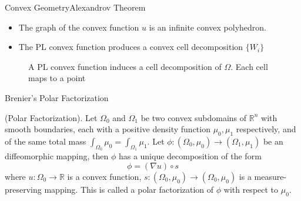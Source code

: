 \documentclass{beamer}
\theoremstyle{definition}
\begin{document}
\begin{frame}{Convex Geometry}{Alexandrov Theorem}
\begin{itemize}
\item The graph of the convex function $u$ is an infinite convex polyhedron.
\item The PL convex function produces a convex cell decomposition $\{W_i\}$
\end{itemize}
\begin{figure}
\centering
{}
\caption{A PL convex function induces a cell decomposition of $\Omega$. Each cell maps to a point}
\label{fig:Alex}
\end{figure}
\end{frame}



\begin{frame}{Brenier's Polar Factorization}
\begin{theorem}
(Polar Factorization\cite{brenier1991polar}). Let $\Omega_0$ and $\Omega_1$ be two convex subdomains of $\mathbb{R}^n$ with smooth boundaries, each with a positive density function $\mu_0,\mu_1$ respectively, and of the same total mass $\int_{\Omega_0}\mu_0=\int_{\Omega_1}\mu_1$. Let $\phi:(\Omega_0,\mu_0)\rightarrow (\Omega_1, \mu_1)$ be an diffeomorphic mapping, then $\phi$ has a unique decomposition of the form $$\phi=(\nabla u)\circ s$$ where $u:\Omega_0\rightarrow \mathbb{R}$ is a convex function, $s:(\Omega_0,\mu_0)\rightarrow(\Omega_0,\mu_0)$ is a measure-preserving mapping. This is called a polar factorization of $\phi$ with respect to $\mu_0$.
\label{Thm:polarfac}
\end{theorem}
\end{frame}
\end{document}
